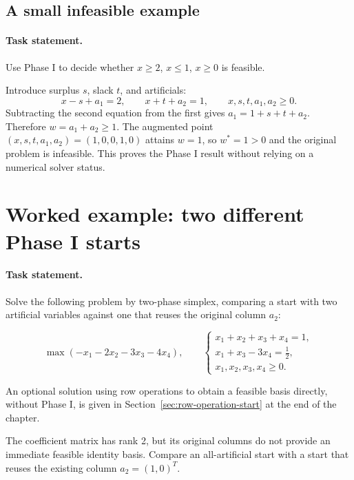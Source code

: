 \documentclass[11pt,a4paper]{article}
\begin{document}
\subsection{A small infeasible example}
\paragraph{Task statement.}
Use Phase I to decide whether $x\geq2$, $x\leq1$, $x\geq0$ is feasible.

Introduce surplus $s$, slack $t$, and artificials:
\[
  x-s+a_1=2,\qquad x+t+a_2=1,\qquad x,s,t,a_1,a_2\geq0.
\]
Subtracting the second equation from the first gives
$a_1=1+s+t+a_2$. Therefore $w=a_1+a_2\geq1$. The augmented point
$(x,s,t,a_1,a_2)=(1,0,0,1,0)$ attains $w=1$, so $w^*=1>0$ and the
original problem is infeasible. This proves the Phase I result without relying
on a numerical solver status.

\clearpage
\section{Worked example: two different Phase I starts}\label{sec:two-phase}
\paragraph{Task statement.}
Solve the following problem by two-phase simplex, comparing a start with two
artificial variables against one that reuses the original column $a_2$:
\begin{lecturecore}
  \begin{equation}\label{eq:two-phase-original}
    \max(-x_1-2x_2-3x_3-4x_4),\qquad
    \begin{cases}
      x_1+x_2+x_3+x_4=1,     \\
      x_1+x_3-3x_4=\tfrac12, \\
      x_1,x_2,x_3,x_4\geq0.
    \end{cases}
  \end{equation}
\end{lecturecore}
An optional solution using row operations to obtain a feasible basis directly,
without Phase I, is given in Section~\ref{sec:row-operation-start} at the end
of the chapter.

The coefficient matrix has rank 2, but its original columns do not provide an
immediate feasible identity basis. Compare an all-artificial start with a start
that reuses the existing column $a_2=(1,0)^T$.
\end{document}

